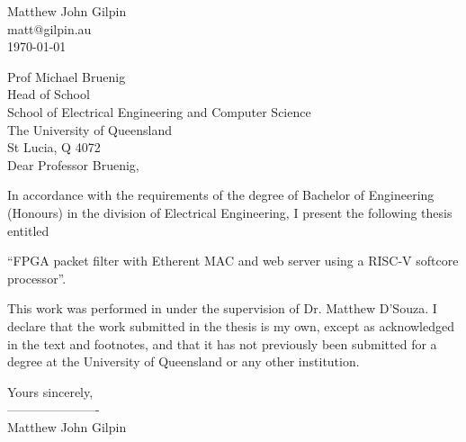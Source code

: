 \fancyhf{}

\begin{flushright}
	Matthew John Gilpin\\
	matt@gilpin.au\\
	\medskip
	\today
\end{flushright}

\begin{flushleft}
  Prof Michael Bruenig\\
  Head of School\\
  School of Electrical Engineering and Computer Science\\
  The University of Queensland\\
  St Lucia, Q 4072\\
  \bigskip\bigskip
  Dear Professor Bruenig,
\end{flushleft}

\noindent
In accordance with the requirements of the degree of Bachelor of
Engineering (Honours) in the division of Electrical Engineering,
I present the following thesis entitled 

\vspace{1em}
{\centering “FPGA packet filter with Etherent MAC and web server using a RISC-V softcore processor”.\par}
\vspace{1em}

\noindent This work was performed in under the supervision of
Dr. Matthew D'Souza. I declare that the work submitted in the thesis is my own, 
except as acknowledged in the text and footnotes, and that it has
not previously been submitted for a degree at the University of 
Queensland or any other institution.\bigskip \bigskip

\begin{flushright}
    
	Yours sincerely,\\
	\bigskip
	----------------------\\
	\medskip
	Matthew John Gilpin
\end{flushright}
\clearpage